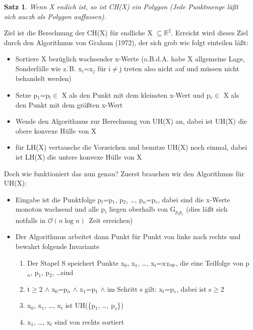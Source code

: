 \documentclass[ngerman,draft,parskip=half*,twoside]{scrreprt}
\theoremstyle{break}
\newtheorem{satz}{Satz}[chapter]
\theoremstyle{nonumberbreak}
\newcommand*{\OO}{\mathcal{O}}      %
\newcommand*{\R}{\mathbb{R}}        %
\begin{document}
\begin{satz}
Wenn X endich ist, so ist CH(X) ein Polygon (Jede Punktmenge läßt sich auczh als Polygon auffassen).
\end{satz}

Ziel ist die Berechnung der CH(X) für endliche X $\subseteq \R^2$. Erreicht wird dieses Ziel durch den Algorithmus von Graham
(1972), der sich grob wie folgt einteilen läßt:

\begin{itemize}
\item Sortiere X bezüglich wachsender x-Werte (o.B.d.A. habe X allgemeine Lage, Sonderfälle wie z.\,B. x$_i$=x$_j$ für i$\neq$j treten
also nicht auf und müssen nicht behandelt werden)
\item Setze p$_1$=p$_l \in$ X als den Punkt mit dem kleinsten x-Wert und p$_r \in$ X als den Punkt mit dem größten x-Wert 
\item Wende den Algorithmus zur Berechnung von UH(X) an, dabei ist UH(X) die obere konvexe Hülle von X
\item für LH(X) vertausche die Vorzeichen und benutze UH(X) noch einmal, dabei ist LH(X) die untere konvexe Hülle von X
\end{itemize}

\begin{figure}[H]
  \centering
  \label{031203b}
\end{figure}

Doch wie funktioniert das nun genau? Zuerst brauchen wir den Algorithmus für UH(X):
\begin{itemize}
\item Eingabe ist die Punktfolge p$_l$=p$_1$, p$_2$, \ldots, p$_n$=p$_r$, dabei sind die x-Werte monoton wachsend und alle p$_i$ liegen
oberhalb von G$_{p_l p_r}$ (dies läßt sich notfalls in $\OO(n\log n)$~Zeit erreichen)
\item Der Algorithmus arbeitet dann Punkt für Punkt von links nach rechts und bewahrt folgende Invariante
  \begin{enumerate}
  \item Der Stapel S speichert Punkte x$_0$, x$_1$, \ldots, x$_t$=x$_{\textnormal{Top}}$, die eine Teilfolge von p$_n$, p$_1$, p$_2$, \ldots sind
  \item t$\geq$2 $\wedge$ x$_0$=p$_n$ $\wedge$ x$_1$=p$_1$ $\wedge$ im Schritt s gilt: x$_t$=p$_s$, dabei ist s$\geq$2
  \item x$_0$, x$_1$, \ldots, x$_t$ ist UH(\{p$_1$, \ldots, p$_s$\})
  \item x$_1$, \ldots, x$_t$ sind von rechts sortiert
  \end{enumerate}
\end{itemize}
\end{document}
